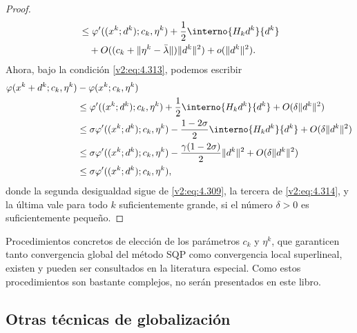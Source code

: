 \begin{proof}
\begin{align*}
&\le \varphi'((x^k; d^k); c_k, \eta^k) + \frac{1}{2} \interno{H_k d^k}{d^k} \\
&\quad + O((c_k + \|\eta^k - \bar{\lambda}\|)\|d^k\|^2) + o(\|d^k\|^2).
\end{align*}
Ahora, bajo la condición \eqref{v2:eq:4.313}, podemos escribir
\begin{align*}
\varphi(x^k + d^k; c_k, \eta^k) &- \varphi(x^k; c_k, \eta^k) \\
&\le \varphi'((x^k; d^k); c_k, \eta^k) + \frac{1}{2} \interno{H_k d^k}{d^k} + O(\delta \|d^k\|^2) \\
&\le \sigma \varphi'((x^k; d^k); c_k, \eta^k) - \frac{1 - 2\sigma}{2} \interno{H_k d^k}{d^k} + O(\delta \|d^k\|^2) \\
&\le \sigma \varphi'((x^k; d^k); c_k, \eta^k) - \frac{\gamma(1 - 2\sigma)}{2} \|d^k\|^2 + O(\delta \|d^k\|^2) \\
&\le \sigma \varphi'((x^k; d^k); c_k, \eta^k),
\end{align*}
donde la segunda desigualdad sigue de \eqref{v2:eq:4.309}, la tercera de \eqref{v2:eq:4.314}, y la última vale para todo $k$ suficientemente grande, si el número $\delta > 0$ es suficientemente pequeño.
\end{proof}

Procedimientos concretos de elección de los parámetros $c_k$ y $\eta^k$, que garanticen tanto convergencia global del método SQP como convergencia local superlineal, existen y pueden ser consultados en la literatura especial. Como estos procedimientos son bastante complejos, no serán presentados en este libro.

\subsection{Otras técnicas de globalización}
\label{v2:sec:4.6.5}

